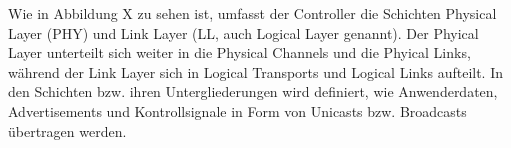 Wie in Abbildung X
zu sehen ist, umfasst der Controller die Schichten Physical Layer (PHY) und Link Layer (LL, auch Logical Layer genannt). Der Phyical Layer unterteilt sich weiter in die Physical Channels und die Phyical Links, während der Link Layer sich in Logical Transports und Logical Links aufteilt. In den Schichten bzw. ihren Untergliederungen wird definiert, wie Anwenderdaten, Advertisements und Kontrollsignale in Form von Unicasts bzw. Broadcasts übertragen werden.

